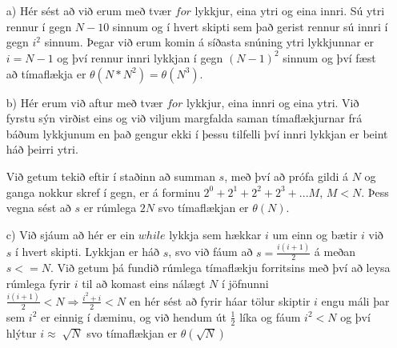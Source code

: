 \documentclass{article}
\begin{document}
	\section{}
	\begin{itemize}
		\item[a)] Hér sést að við erum með tvær $for$ lykkjur, eina ytri og eina innri. Sú ytri rennur í gegn $N-10$ sinnum og í hvert skipti sem það gerist rennur sú innri í gegn $i^2$ sinnum. Þegar við erum komin á síðasta snúning ytri lykkjunnar er $i=N-1$ og því rennur innri lykkjan í gegn $(N-1)^2$ sinnum og því fæst að tímaflækja er $\theta(N*N^2)=\theta(N^3)$.
		\item[b)] Hér erum við aftur með tvær $for$ lykkjur, eina innri og eina ytri. Við fyrstu sýn virðist eins og við viljum margfalda saman tímaflækjurnar frá báðum lykkjunum en það gengur ekki í þessu tilfelli því innri lykkjan er beint háð þeirri ytri.
		
		Við getum tekið eftir í staðinn að summan $s$, með því að prófa gildi á $N$ og ganga nokkur skref í gegn, er á forminu $2^0+2^1+2^2+2^3+...M$, $M<N$. Þess vegna sést að $s$ er rúmlega $2N$ svo tímaflækjan er $\theta(N)$.
		\item[c)] Við sjáum að hér er ein $while$ lykkja sem hækkar $i$ um einn og bætir $i$ við $s$ í hvert skipti. Lykkjan er háð $s$, svo við fáum að $s=\frac{i(i+1)}{2}$ á meðan $s<=N$. Við getum þá fundið rúmlega tímaflækju forritsins með því að leysa rúmlega fyrir $i$ til að komast eins nálægt $N$ í jöfnunni $\frac{i(i+1)}{2}<N \Rightarrow \frac{i^2+i}{2}<N$ en hér sést að fyrir háar tölur skiptir $i$ engu máli þar sem $i^2$ er einnig í dæminu, og við hendum út $\frac{1}{2}$ líka og fáum $i^2<N$ og því hlýtur $i \approx \sqrt[]{N}$ svo tímaflækjan er $\theta(\sqrt{N})$
	\end{itemize}
	\newpage
	\section{}
	
\end{document}
